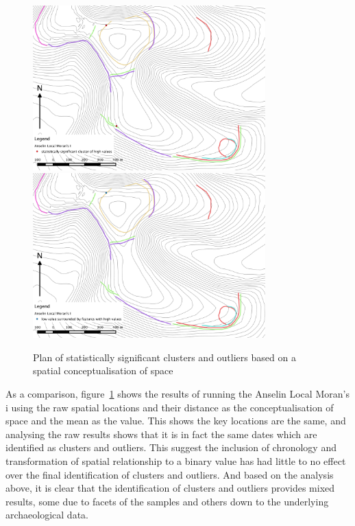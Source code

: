 \begin{figure}
\centering
	\includegraphics[width=0.8\textwidth]{figures/cluster-HH-mean}
	\includegraphics[width=0.8\textwidth]{figures/cluster-LH-mean}
  \caption{Plan of statistically significant clusters and outliers based on a spatial conceptualisation of space}
  \label{fig:cluster-mean}
\end{figure}

As a comparison, figure~\ref{fig:cluster-mean} shows the results of running the Anselin Local Moran's i using the raw spatial locations and their distance as the conceptualisation of space and the mean as the value. This shows the key locations are the same, and analysing the raw results shows that it is in fact the same dates which are identified as clusters and outliers. This suggest the inclusion of chronology and transformation of spatial relationship to a binary value has had little to no effect over the final identification of clusters and outliers. And based on the analysis above, it is clear that the identification of clusters and outliers provides mixed results, some due to facets of the samples and others down to the underlying archaeological data. 

